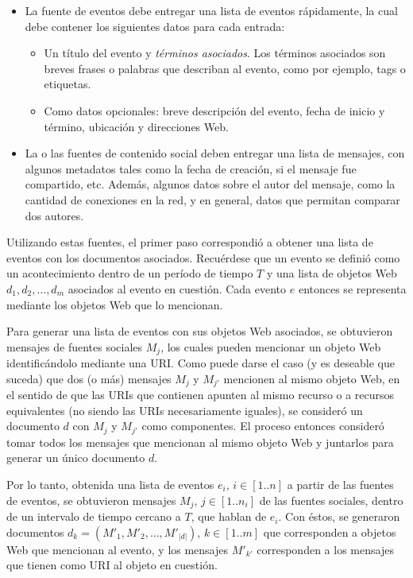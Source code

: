 \begin{itemize}
\item La fuente de eventos debe entregar una lista de eventos
     rápidamente, la cual debe contener los siguientes datos para
     cada entrada:

\begin{itemize}
\item Un título del evento y \emph{términos asociados}. Los términos
       asociados son breves frases o palabras que describan al
       evento, como por ejemplo, tags o etiquetas.
\item Como datos opcionales: breve descripción del evento, fecha de
       inicio y término, ubicación y direcciones Web.
\end{itemize}

\item La o las fuentes de contenido social deben entregar una lista de
     mensajes, con algunos metadatos tales como la fecha de creación,
     si el mensaje fue compartido, etc. Además, algunos datos sobre el
     autor del mensaje, como la cantidad de conexiones en la red, y
     en general, datos que permitan comparar dos autores.
\end{itemize}


   Utilizando estas fuentes, el primer paso correspondió a obtener una
   lista de eventos con los documentos asociados. Recuérdese que un evento se definió
   como un acontecimiento dentro de un período de tiempo $T$ y una lista de objetos Web
   $d_1, d_2, \ldots, d_m$ asociados al evento en cuestión. Cada evento $e$ entonces se
   representa mediante los objetos Web que lo mencionan. 

   Para generar una lista de eventos con sus objetos Web asociados, se obtuvieron 
   mensajes de fuentes sociales $M_j$, los cuales pueden mencionar un objeto Web identificándolo
   mediante una URI. Como puede darse el caso (y es deseable que suceda) que dos (o más) mensajes
   $M_j$ y $M_{j'}$ mencionen al mismo objeto Web, en el sentido de que las URIs que contienen
   apunten al mismo recurso o a recursos equivalentes (no siendo las URIs necesariamente iguales),
   se consideró un documento $d$ con $M_j$ y $M_{j'}$ como componentes. El proceso entonces
   consideró tomar todos los mensajes que mencionan al mismo objeto Web y juntarlos para generar
   un único documento $d$.

   Por lo tanto, obtenida una lista de eventos $e_i$, $i\in [1..n]$ a partir de las fuentes de eventos,
   se obtuvieron mensajes $M_j$, $j \in [1..n_i]$ de las fuentes sociales, dentro de un intervalo de tiempo cercano a $T$, que hablan de $e_i$. Con éstos, se generaron
   documentos $d_k = (M'_1, M'_2, \ldots, M'_{|d|})$, $k \in [1..m]$ que corresponden a objetos Web
   que mencionan al evento, y los mensajes $M'_{k'}$ corresponden a los mensajes que tienen como URI al
   objeto en cuestión.

